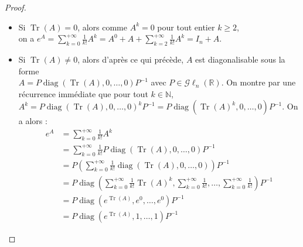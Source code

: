 \documentclass[a4paper]{article}
\begin{document}
\begin{proof}
    \begin{itemize}
        \item Si $\operatorname{Tr}(A) = 0$, alors comme $A^k = 0$ pour tout entier $k \geq 2$,\\ on a $\displaystyle e^A = \sum_{k=0}^{+\infty} \frac{1}{k!}A^k = A^0 + A + \sum_{k=2}^{+\infty} \frac{1}{k!}A^k = I_n + A$.
        \item Si $\operatorname{Tr}(A) \neq 0$, alors d'après ce qui précède, $A$ est diagonalisable sous la forme \\ $A = P \operatorname{diag}(\operatorname{Tr}(A), 0, \dots, 0)P^{-1}$ avec $P \in \mathcal{G}\ell_n(\mathbb{R})$. On montre par une récurrence immédiate que pour tout $k \in \mathbb{N}$,\\ $A^k =  P \operatorname{diag}(\operatorname{Tr}(A), 0, \dots, 0)^kP^{-1} =  P \operatorname{diag}\left(\operatorname{Tr}(A)^k, 0, \dots, 0\right)P^{-1}$. On a alors :
        \begin{align*}
            e^A &= \sum_{k=0}^{+\infty} \frac{1}{k!}A^k\\
            &= \sum_{k=0}^{+\infty}  \frac{1}{k!} P \operatorname{diag}(\operatorname{Tr}(A), 0, \dots, 0)P^{-1}\\
            &= P \left(\sum_{k=0}^{+\infty}  \frac{1}{k!} \operatorname{diag}(\operatorname{Tr}(A), 0, \dots, 0)\right) P^{-1}\\
            &= P \operatorname{diag}\left(\sum_{k=0}^{+\infty}  \frac{1}{k!} \operatorname{Tr}(A)^k, \sum_{k=0}^{+\infty}  \frac{1}{k!}, \dots, \sum_{k=0}^{+\infty}  \frac{1}{k!}\right) P^{-1}\\
            &= P \operatorname{diag}\left(e^{\operatorname{Tr}(A)}, e^0, \dots, e^0\right) P^{-1}\\
            &= P\operatorname{diag}\left(e^{\operatorname{Tr}(A)}, 1, \dots, 1\right)P^{-1}
        \end{align*}
    \end{itemize}
\end{proof}
\end{document}

